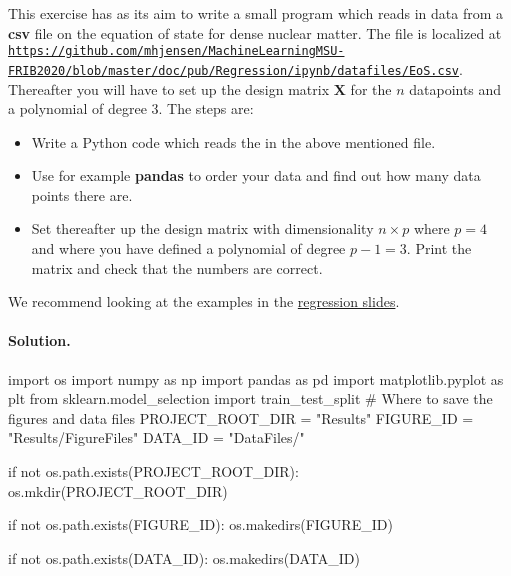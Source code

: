 \documentclass[%
oneside,                 %
final,                   %
10pt]{article}
\newenvironment{doconceexercise}{}{}
\newcounter{doconceexercisecounter}
\begin{document}
\begin{doconceexercise}



This exercise has as its aim to write a small program which reads in data from a \textbf{csv} file on the equation of state for dense nuclear matter. The file is localized at \href{{https://github.com/mhjensen/MachineLearningMSU-FRIB2020/blob/master/doc/pub/Regression/ipynb/datafiles/EoS.csv}}{\nolinkurl{https://github.com/mhjensen/MachineLearningMSU-FRIB2020/blob/master/doc/pub/Regression/ipynb/datafiles/EoS.csv}}. Thereafter you will have to set up the design matrix $\bm{X}$ for the  $n$
datapoints and a polynomial of degree $3$. The steps are:
\begin{itemize}
\item Write a Python code which reads the in the above mentioned file.

\item Use for example \textbf{pandas} to order your data and find out how many data points there are.

\item Set thereafter up the design matrix with dimensionality $n\times p$ where $p=4$ and where you have defined a polynomial of degree $p-1=3$. Print the matrix and check that the numbers are correct. 
\end{itemize}

\noindent
We recommend looking at the examples in the \href{{https://compphysics.github.io/MachineLearning/doc/pub/Regression/html/Regression-bs.html}}{regression slides}.


\paragraph{Solution.}
\bpycod
import os
import numpy as np
import pandas as pd
import matplotlib.pyplot as plt
from sklearn.model_selection import train_test_split
# Where to save the figures and data files
PROJECT_ROOT_DIR = "Results"
FIGURE_ID = "Results/FigureFiles"
DATA_ID = "DataFiles/"

if not os.path.exists(PROJECT_ROOT_DIR):
    os.mkdir(PROJECT_ROOT_DIR)

if not os.path.exists(FIGURE_ID):
    os.makedirs(FIGURE_ID)

if not os.path.exists(DATA_ID):
    os.makedirs(DATA_ID)


\end{doconceexercise}
\end{document}
